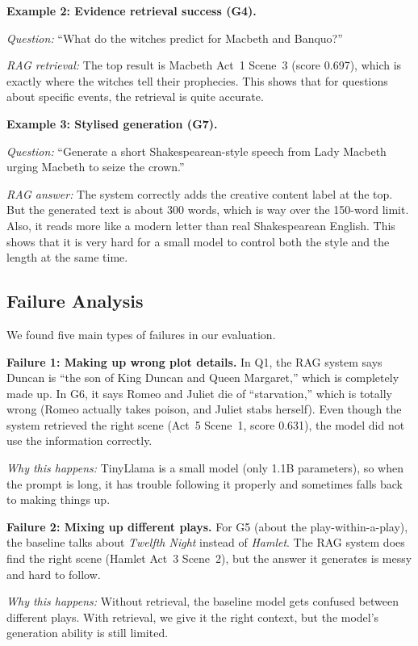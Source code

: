 \documentclass[10pt,conference]{IEEEtran}
\begin{document}
\medskip

\textbf{Example 2: Evidence retrieval success (G4).}

\textit{Question:} ``What do the witches predict for Macbeth and Banquo?''

\textit{RAG retrieval:} The top result is Macbeth Act~1 Scene~3 (score 0.697), which is exactly where the witches tell their prophecies. This shows that for questions about specific events, the retrieval is quite accurate.

\medskip

\textbf{Example 3: Stylised generation (G7).}

\textit{Question:} ``Generate a short Shakespearean-style speech from Lady Macbeth urging Macbeth to seize the crown.''

\textit{RAG answer:} The system correctly adds the creative content label at the top. But the generated text is about 300 words, which is way over the 150-word limit. Also, it reads more like a modern letter than real Shakespearean English. This shows that it is very hard for a small model to control both the style and the length at the same time.

\subsection{Failure Analysis}

We found five main types of failures in our evaluation.

\textbf{Failure 1: Making up wrong plot details.}
In Q1, the RAG system says Duncan is ``the son of King Duncan and Queen Margaret,'' which is completely made up. In G6, it says Romeo and Juliet die of ``starvation,'' which is totally wrong (Romeo actually takes poison, and Juliet stabs herself). Even though the system retrieved the right scene (Act~5 Scene~1, score 0.631), the model did not use the information correctly.

\textit{Why this happens:} TinyLlama is a small model (only 1.1B parameters), so when the prompt is long, it has trouble following it properly and sometimes falls back to making things up.

\textbf{Failure 2: Mixing up different plays.}
For G5 (about the play-within-a-play), the baseline talks about \textit{Twelfth Night} instead of \textit{Hamlet}. The RAG system does find the right scene (Hamlet Act~3 Scene~2), but the answer it generates is messy and hard to follow.

\textit{Why this happens:} Without retrieval, the baseline model gets confused between different plays. With retrieval, we give it the right context, but the model's generation ability is still limited.
\end{document}
